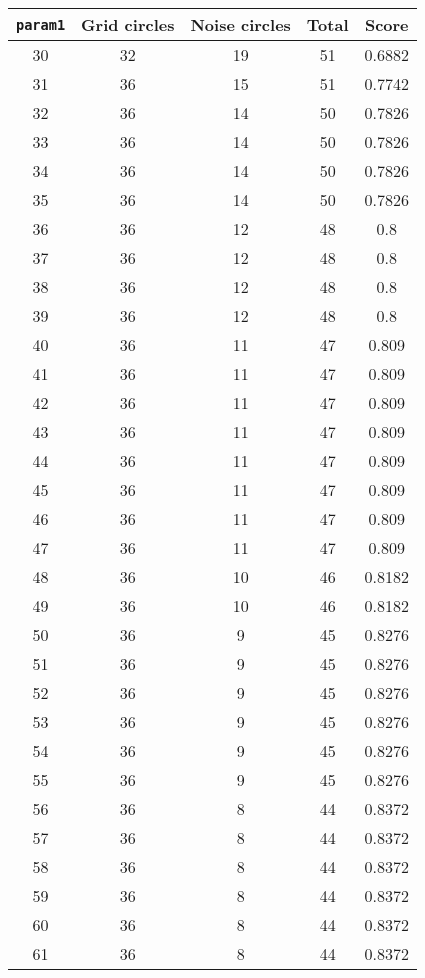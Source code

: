 \documentclass[letterpaper, 12pt]{article}
\begin{document}
\begin{longtable}{|c|c|c|c|c|}
\hline
\textbf{\texttt{param1}} & \textbf{Grid circles} & \textbf{Noise circles} & \textbf{Total} & \textbf{Score} \\
\hline
30 & 32 & 19 & 51 & 0.6882 \\
\hline
31 & 36 & 15 & 51 & 0.7742 \\
\hline
32 & 36 & 14 & 50 & 0.7826 \\
\hline
33 & 36 & 14 & 50 & 0.7826 \\
\hline
34 & 36 & 14 & 50 & 0.7826 \\
\hline
35 & 36 & 14 & 50 & 0.7826 \\
\hline
36 & 36 & 12 & 48 & 0.8 \\
\hline
37 & 36 & 12 & 48 & 0.8 \\
\hline
38 & 36 & 12 & 48 & 0.8 \\
\hline
39 & 36 & 12 & 48 & 0.8 \\
\hline
40 & 36 & 11 & 47 & 0.809 \\
\hline
41 & 36 & 11 & 47 & 0.809 \\
\hline
42 & 36 & 11 & 47 & 0.809 \\
\hline
43 & 36 & 11 & 47 & 0.809 \\
\hline
44 & 36 & 11 & 47 & 0.809 \\
\hline
45 & 36 & 11 & 47 & 0.809 \\
\hline
46 & 36 & 11 & 47 & 0.809 \\
\hline
47 & 36 & 11 & 47 & 0.809 \\
\hline
48 & 36 & 10 & 46 & 0.8182 \\
\hline
49 & 36 & 10 & 46 & 0.8182 \\
\hline
50 & 36 & 9 & 45 & 0.8276 \\
\hline
51 & 36 & 9 & 45 & 0.8276 \\
\hline
52 & 36 & 9 & 45 & 0.8276 \\
\hline
53 & 36 & 9 & 45 & 0.8276 \\
\hline
54 & 36 & 9 & 45 & 0.8276 \\
\hline
55 & 36 & 9 & 45 & 0.8276 \\
\hline
56 & 36 & 8 & 44 & 0.8372 \\
\hline
57 & 36 & 8 & 44 & 0.8372 \\
\hline
58 & 36 & 8 & 44 & 0.8372 \\
\hline
59 & 36 & 8 & 44 & 0.8372 \\
\hline
60 & 36 & 8 & 44 & 0.8372 \\
\hline
61 & 36 & 8 & 44 & 0.8372 \\

\end{longtable}
\end{document}
